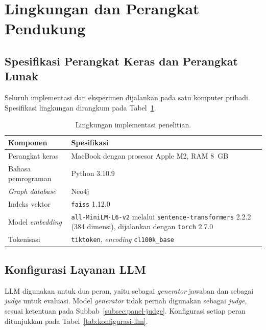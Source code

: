 \section{Lingkungan dan Perangkat Pendukung}
\label{sec:lingkungan-implementasi}

\subsection{Spesifikasi Perangkat Keras dan Perangkat Lunak}
\label{subsec:spesifikasi-lingkungan}

Seluruh implementasi dan eksperimen dijalankan pada satu komputer pribadi. Spesifikasi lingkungan dirangkum pada Tabel~\ref{tab:lingkungan-implementasi}.

\begin{table}[!htbp]
\centering
\small
\caption{Lingkungan implementasi penelitian.}
\label{tab:lingkungan-implementasi}
\renewcommand{\arraystretch}{1.2}
\begin{tabularx}{\textwidth}{|>{\raggedright\arraybackslash}p{3.8cm}|>{\raggedright\arraybackslash}X|}
\hline
\textbf{Komponen} & \textbf{Spesifikasi} \\
\hline
Perangkat keras & MacBook dengan prosesor Apple M2, RAM 8~GB \\
\hline
Bahasa pemrograman & Python 3.10.9 \\
\hline
\emph{Graph database} & Neo4j  \\
\hline
Indeks vektor & \texttt{faiss} 1.12.0 \\
\hline
Model \emph{embedding} & \texttt{all-MiniLM-L6-v2} melalui \texttt{sentence-transformers} 2.2.2 (384 dimensi), dijalankan dengan \texttt{torch} 2.7.0 \\
\hline
Tokenisasi & \texttt{tiktoken}, \emph{encoding} \texttt{cl100k\_base} \\
\hline
\end{tabularx}
\end{table}

\subsection{Konfigurasi Layanan LLM}
\label{subsec:konfigurasi-llm}

LLM digunakan untuk dua peran, yaitu sebagai \emph{generator} jawaban dan sebagai \emph{judge} untuk evaluasi. Model \emph{generator} tidak pernah digunakan sebagai \emph{judge}, sesuai ketentuan pada Subbab~\ref{subsec:panel-judge}. Konfigurasi setiap peran ditunjukkan pada Tabel~\ref{tab:konfigurasi-llm}.

